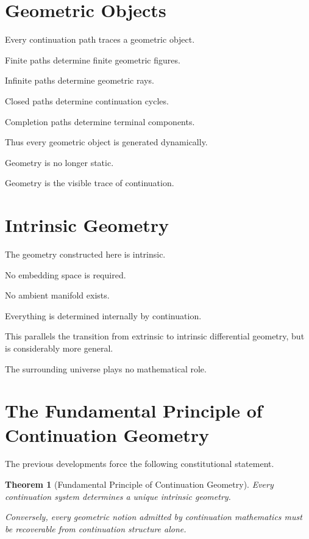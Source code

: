\documentclass[13pt,openany]{book}
\theoremstyle{plain}
\newtheorem{theorem}{Theorem}[chapter]
\theoremstyle{definition}
\begin{document}

\section{Geometric Objects}

Every continuation path traces a geometric object.

Finite paths determine finite geometric figures.

Infinite paths determine geometric rays.

Closed paths determine continuation cycles.

Completion paths determine terminal components.

Thus every geometric object is generated dynamically.

Geometry is no longer static.

Geometry is the visible trace of continuation.


\section{Intrinsic Geometry}

The geometry constructed here is intrinsic.

No embedding space is required.

No ambient manifold exists.

Everything is determined internally by continuation.

This parallels the transition from extrinsic to intrinsic differential geometry, but is considerably more general.

The surrounding universe plays no mathematical role.


\section{The Fundamental Principle of Continuation Geometry}

The previous developments force the following constitutional statement.

\begin{theorem}[Fundamental Principle of Continuation Geometry]
Every continuation system determines a unique intrinsic geometry.

Conversely, every geometric notion admitted by continuation mathematics must be recoverable from continuation structure alone.
\end{theorem}
\end{document}
